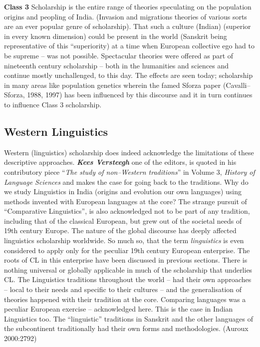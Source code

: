 \textbf{Class 3} Scholarship is the entire range of theories speculating on the population origins and peopling of India. (Invasion and migrations theories of various sorts are an ever popular genre of scholarship). That such a culture (Indian) (superior in every known dimension) could be present in the world (Sanskrit being representative of this “superiority) at a time when European collective ego had to be supreme – was not possible. Spectacular theories were offered as part of nineteenth century scholarship – both in the humanities and sciences and continue mostly unchallenged, to this day. The effects are seen today; scholarship in many areas like population genetics wherein the famed Sforza paper (Cavalli–Sforza, 1988, 1997) has been influenced by this discourse and it in turn continues to influence Class 3 scholarship.


\subsection*{Western Linguistics}

Western (linguistics) scholarship does indeed acknowledge the limitations of these descriptive approaches. \textbf{\textit{Kees Versteegh}} one of the editors, is quoted in his contributory piece “\textit{The study of non–Western traditions}” in Volume 3, \textit{History of Language Sciences} and makes the case for going back to the traditions. Why do we study Linguistics in India (origins and evolution our own languages) using methods invented with European languages at the core? The strange pursuit of “Comparative Linguistics”, is also acknowledged not to be part of any tradition, including that of the classical European, but grew out of the societal needs of 19th century Europe. The nature of the global discourse has deeply affected linguistics scholarship worldwide. So much so, that the term \textit{linguistics} is even considered to apply only for the peculiar 19th century European enterprise. The roots of CL in this enterprise have been discussed in previous sections. There is nothing universal or globally applicable in much of the scholarship that underlies CL. The Linguistics traditions throughout the world – had their own approaches – local to their needs and specific to their cultures – and the generalisation of theories happened with their tradition at the core. Comparing languages was a peculiar European exercise – acknowledged here. This is the case in Indian Linguistics too. The “linguistic” traditions in Sanskrit and the other languages of the subcontinent traditionally had their own forms and methodologies. (Auroux 2000:2792)

